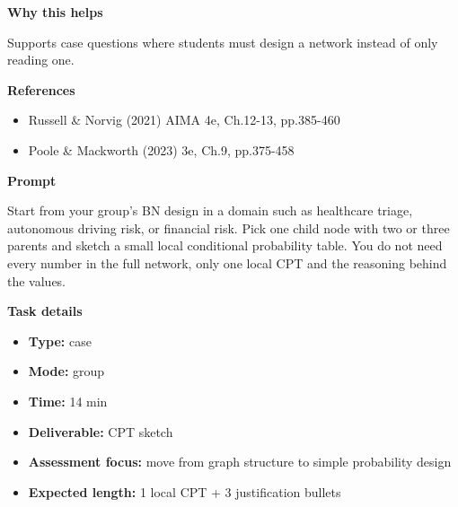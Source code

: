 \documentclass[11pt]{article}
\begin{document}
\begin{tcolorbox}[colback=white,colframe=MidnightBlue,title={Q3 Structured Problem},fonttitle=\bfseries,breakable]
{\large\bfseries\color{MidnightBlue} Why this helps}\par\medskip
Supports case questions where students must design a network instead of only reading one.

{\large\bfseries\color{MidnightBlue} References}\par\medskip
\begin{itemize}\item Russell \& Norvig (2021) AIMA 4e, Ch.12-13, pp.385-460
\item Poole \& Mackworth (2023) 3e, Ch.9, pp.375-458\end{itemize}
\end{tcolorbox}

\begin{tcolorbox}[colback=white,colframe=MidnightBlue,title={Q4 Collaborative Mini-Case},fonttitle=\bfseries,breakable]
\begin{center}
\end{center}

{\large\bfseries\color{MidnightBlue} Prompt}\par\medskip
Start from your group's BN design in a domain such as healthcare triage, autonomous driving risk, or financial risk. Pick one child node with two or three parents and sketch a small local conditional probability table. You do not need every number in the full network, only one local CPT and the reasoning behind the values.

{\large\bfseries\color{MidnightBlue} Task details}\par\medskip
\begin{itemize}\item \textbf{Type:} case
\item \textbf{Mode:} group
\item \textbf{Time:} 14 min
\item \textbf{Deliverable:} CPT sketch
\item \textbf{Assessment focus:} move from graph structure to simple probability design
\item \textbf{Expected length:} 1 local CPT + 3 justification bullets\end{itemize}


\end{tcolorbox}
\end{document}
